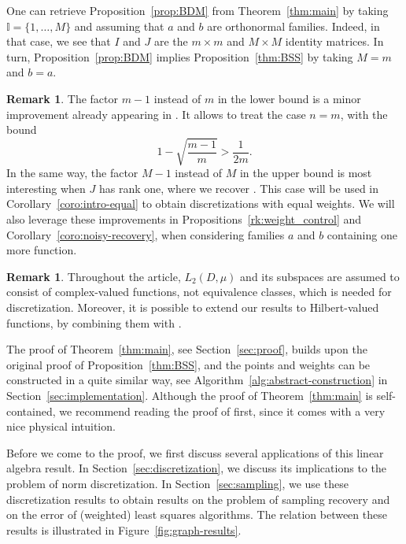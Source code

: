 \documentclass[a4paper,11pt]{article}
\renewcommand{\(}{\left (}
\renewcommand{\)}{\right )}
\newcommand{\<}{\langle}
\renewcommand{\>}{\rangle}
\theoremstyle{definition}
\newtheorem{remark}[theorem]{Remark}
\begin{document}
\smallskip

One can retrieve Proposition~\ref{prop:BDM} from Theorem~\ref{thm:main} by taking $\mathbb I=\{1,\dots,M\}$ and assuming that $a$ and $b$ are orthonormal families. Indeed, in that case, we see that $I$ and $J$ are the $m\times m$ and $M\times M$ identity matrices. In turn, Proposition~\ref{prop:BDM} implies Proposition~\ref{thm:BSS} by taking $M=m$ and $b=a$.

\begin{remark}
The factor $m-1$ instead of $m$ in the lower bound is a minor improvement
already appearing in \cite{ChkifaDolbeault24}. It allows to treat the case $n=m$, with the bound
\[
1-\sqrt{\frac{m-1}{m}}>\frac{1}{2m}.
\]
In the same way, the factor $M-1$ instead of $M$ 
in the upper bound is most interesting when $J$ has rank one, where we recover \cite[Lemma~14]{BDM14}.
This case will be used in Corollary~\ref{coro:intro-equal} to obtain discretizations with equal weights. We will also leverage these improvements in Propositions~\ref{rk:weight_control} and Corollary~\ref{coro:noisy-recovery}, when considering families $a$ and $b$ containing one more function.
\end{remark}

\begin{remark}
Throughout the article, $L_2(D,\mu)$ and its subspaces are assumed to consist of complex-valued functions, not equivalence classes, which is needed for discretization. 
Moreover, it is possible to extend our results to Hilbert-valued functions, by combining them with \cite[Theorem 2.1]{BartelDung24}.
\end{remark}


The proof of Theorem~\ref{thm:main}, see Section~\ref{sec:proof}, 
builds upon the original proof of Proposition~\ref{thm:BSS},  
and the points and weights can be constructed in a quite similar way, see Algorithm~\ref{alg:abstract-construction} in Section~\ref{sec:implementation}.
Although the proof of Theorem~\ref{thm:main} is self-contained, 
we recommend reading the proof of \cite[Theorem~3.1]{BSS} first, since it comes with a very nice physical intuition.


Before we come to the proof, we first discuss several applications of this linear algebra result.
In Section~\ref{sec:discretization}, we discuss its implications to the problem of norm discretization.
In Section~\ref{sec:sampling}, we use these discretization results to obtain results on the problem of sampling recovery
and on the error of (weighted) least squares algorithms. The relation between these results is illustrated in Figure~\ref{fig:graph-results}.
\end{document}
